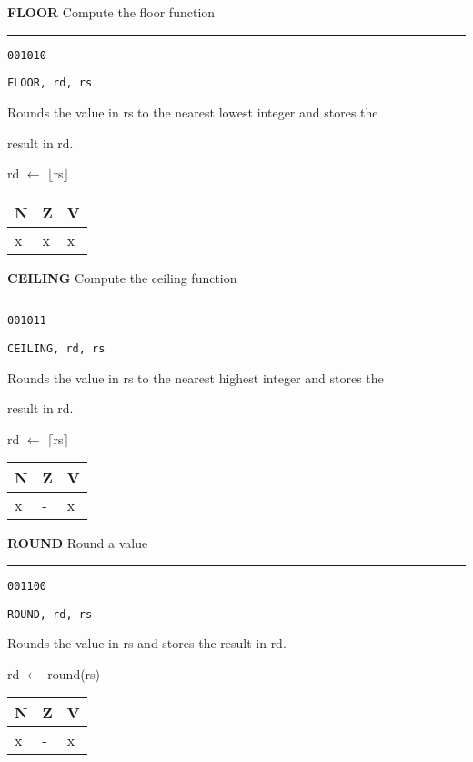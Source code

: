 \documentclass{article}
\begin{document}
\flushleft
\LARGE\textbf{FLOOR} \large \hfill Compute the floor function

\kern-3pt
\noindent\rule{16.5cm}{0.4pt}
\normalsize

{\large
	 \texttt{001010} \par
	\smallbreak
	 \texttt{FLOOR, rd, rs} \par
	\smallbreak
	 Rounds the value in rs to the nearest lowest integer and stores the \par
	\makebox[3.5cm][l]{  } result in rd. \par
	\smallbreak
	 rd $\leftarrow$ $\lfloor$rs$\rfloor$ \par
	\smallbreak
	 \begin{tabular}{lll} N \quad & Z \quad & V \\ \hline x & x & x \\ \end{tabular}
}

\pagebreak

\flushleft
\LARGE\textbf{CEILING} \large \hfill Compute the ceiling function

\kern-3pt
\noindent\rule{16.5cm}{0.4pt}
\normalsize

{\large
	 \texttt{001011} \par
	\smallbreak
	 \texttt{CEILING, rd, rs} \par
	\smallbreak
	 Rounds the value in rs to the nearest highest integer and stores the \par
	\makebox[3.5cm][l]{  } result in rd. \par
	\smallbreak
	 rd $\leftarrow$ $\lceil$rs$\rceil$ \par
	\smallbreak
	 \begin{tabular}{lll} N \quad & Z \quad & V \\ \hline x & - & x \\ \end{tabular}
}

\bigskip\bigskip

\flushleft
\LARGE\textbf{ROUND} \large \hfill Round a value

\kern-3pt
\noindent\rule{16.5cm}{0.4pt}
\normalsize

{\large
	 \texttt{001100} \par
	\smallbreak
	 \texttt{ROUND, rd, rs} \par
	\smallbreak
	 Rounds the value in rs and stores the result in rd. \par
	\smallbreak
	 rd $\leftarrow$ round(rs) \par
	\smallbreak
	 \begin{tabular}{lll} N \quad & Z \quad & V \\ \hline x & - & x \\ \end{tabular}
}
\end{document}
